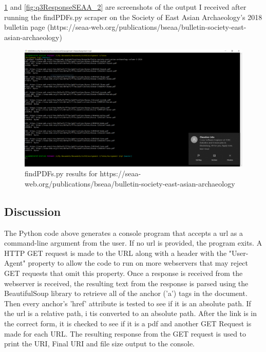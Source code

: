 \documentclass[12pt]{article}
\begin{document}
\ref{fig:q3ResponseSEAA_1} and \ref{fig:q3ResponseSEAA_2} are screenshots of the output I received after running the findPDFs.py scraper on the Society of East Asian Archaeology's 2018 bulletin page (https://seaa-web.org/publications/bseaa/bulletin-society-east-asian-archaeology)
\begin{figure}[H]
    \centering
    \includegraphics[trim=0 60 10 20, clip, width=\textwidth] {Q3/q3-seaaBulletin2016.png}
    \caption{findPDFs.py results for https://seaa-web.org/publications/bseaa/bulletin-society-east-asian-archaeology}
    \label{fig:q3ResponseSEAA_1}
\end{figure}


\subsection*{Discussion}

The Python code above generates a console program that accepts a url as a command-line argument from the user. If no url is provided, the program exits. A HTTP GET request is made to the URL along with a header with the "User-Agent" property to allow the code to run on more webservers that may reject GET requests that omit this property. Once a response is received from the webserver is received, the resulting text from the response is parsed using the BeautifulSoup library to retrieve all of the anchor ('a') tags in the document. Then every anchor's 'href' attribute is tested to see if it is an absolute path. If the url is a relative path, i tis converted to an absolute path. After the link is in the correct form, it is checked to see if it is a pdf and another GET Request is made for each URL. The resulting response from the GET request is used to print the URI, Final URI and file size output to the console. 
\end{document}
